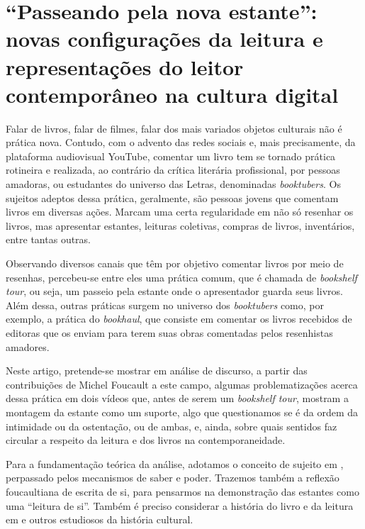 \section{\enquote{Passeando pela nova estante}: novas configurações da leitura e representações do leitor contemporâneo na cultura digital}\label{Sec-passeando}

Falar de livros, falar de filmes, falar dos mais variados objetos culturais não é prática nova. Contudo, com o advento das redes sociais e, mais precisamente, da plataforma audiovisual YouTube, comentar um livro tem se tornado prática rotineira e realizada, ao contrário da crítica literária profissional, por pessoas amadoras, ou estudantes do universo das Letras, denominadas \textit{booktubers}. Os sujeitos adeptos dessa prática, geralmente, são pessoas jovens que comentam livros em diversas ações. Marcam uma certa regularidade em não só resenhar os livros, mas apresentar estantes, leituras coletivas, compras de livros, inventários, entre tantas outras.

Observando diversos canais que têm por objetivo comentar livros por meio de resenhas, percebeu-se entre eles uma prática comum, que é chamada de \textit{bookshelf tour}, ou seja, um passeio pela estante onde o apresentador guarda seus livros. Além dessa, outras práticas surgem no universo dos \textit{booktubers} como, por exemplo, a prática do \textit{bookhaul}, que consiste em comentar os livros recebidos de editoras que os enviam para terem suas obras comentadas pelos resenhistas amadores. 

Neste artigo, pretende-se mostrar em análise de discurso, a partir das contribuições de Michel Foucault a este campo, algumas problematizações acerca dessa prática em dois vídeos que, antes de serem um \textit{bookshelf tour}, mostram a montagem da estante como um suporte, algo que questionamos se é da ordem da intimidade ou da ostentação, ou de ambas, e, ainda, sobre quais sentidos faz circular a respeito da leitura e dos livros na contemporaneidade.

Para a fundamentação teórica da análise, adotamos o conceito de sujeito em  \textcite{foucault2009arqueologia}, perpassado pelos mecanismos de saber e poder. Trazemos também a reflexão foucaultiana de escrita de si, para pensarmos na demonstração das estantes como uma “leitura de si”. Também é preciso considerar a história do livro e da leitura em \textcite{chartier1998aventura,chartier1999ordem,chartier2019lersem} e outros estudiosos da história cultural. 

